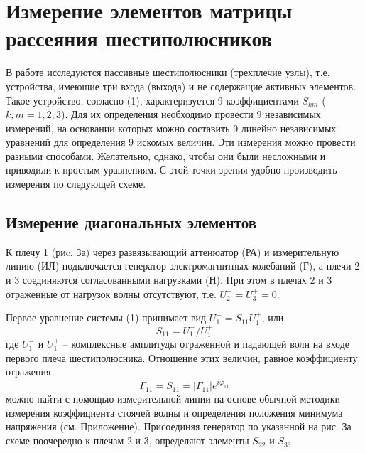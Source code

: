 ﻿\documentclass[a4paper,11pt]{article}
\begin{document}
\section{Измерение элементов матрицы рассеяния шестиполюсников}

В работе исследуются пассивные шестиполюсники (трехплечие узлы), т.е. устройства, имеющие три входа (выхода) и не содержащие активных элементов. 
Такое устройство, согласно (1), характеризуется 9 коэффициентами $S_{km}$ ($k,m=1,2,3$). 
Для их определения необходимо провести 9 независимых измерений, на основании которых можно составить 9 линейно независимых уравнений для определения 9 искомых величин. 
Эти измерения можно провести разными способами. 
Желательно, однако, чтобы они были несложными и приводили к простым уравнениям. 
С этой точки зрения удобно производить измерения по следующей схеме.

\subsection{Измерение диагональных элементов}
К плечу 1 (риc. За) через развязывающий аттенюатор (РА) и измерительную линию (ИЛ) подключается генератор электромагнитных  колебаний (Г), а плечи 2 и 3 соединяются согласованными нагрузками (Н). 
При этом в плечах 2 и 3 отраженные от нагрузок волны отсутствуют, т.е. $U _ { 2 } ^ { + } = U _ { 3 } ^ { + } = 0$.


Первое уравнение системы (1) принимает вид $U_1^-=S_{11}U_1^+$, или
\begin{equation}
	S _ { 11 } = U _ { 1 } ^ { - } / U _ { 1 } ^ { + }
\end{equation}
где $U _ { 1 } ^ { - }$ и $U _ { 1 } ^ { + }$ -- комплексные амплитуды отраженной и падающей волн на входе первого плеча шестиполюсника. Отношение этих величин, равное коэффициенту отражения 
\begin{equation}
	\Gamma _ { 11 } = S _ { 11 } = \left| \Gamma _ { 11 } \right| e ^ { i \varphi _ { 11 } }
\end{equation}
можно найти с помощью измерительной линии на основе обычной методики измерения коэффициента стоячей волны и определения положения минимума напряжения (см. Приложение). 
Присоединяя генератор по указанной на рис. За схеме поочередно к плечам 2 и 3, определяют элементы $S_{22}$ и $S_{33}$.
\end{document}
